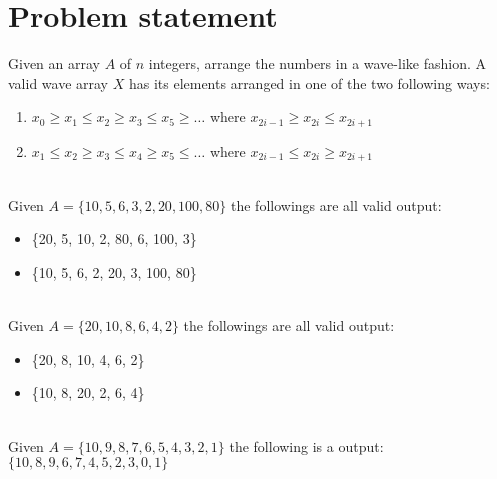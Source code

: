 \section{Problem statement}
\begin{exercise}
Given an array $A$ of $n$ integers, arrange the numbers in a wave-like fashion. A valid wave array $X$ has its elements arranged in one of the two following ways:
	\begin{enumerate}
		\item  $x_0 \geq x_1 \leq x_2 \geq x_3 \leq  x_5 \geq \ldots$ where $x_{2i-1} \geq x_{2i} \leq x_{2i+1}$
		\item  $x_1 \leq x_2 \geq x_3 \leq x_4 \geq x_5 \leq \ldots$ where $x_{2i-1} \leq x_{2i} \geq x_{2i+1}$
	\end{enumerate}


	\begin{example}
		\hfill \\
		\label{ex:wave_array:example1}
		Given $A= \{10, 5, 6, 3, 2, 20, 100, 80\}$ the followings are all valid output:
		\begin{itemize}
			\item  \{20, 5, 10, 2, 80, 6, 100, 3\}
			\item  \{10, 5, 6, 2, 20, 3, 100, 80\}
		\end{itemize}
	\end{example}

	\begin{example}
		\hfill \\
		\label{ex:wave_array:example2}
		Given $A= \{20, 10, 8, 6, 4, 2\}$ the followings are all valid output:
		\begin{itemize}
			\item \{20, 8, 10, 4, 6, 2\}
			\item  \{10, 8, 20, 2, 6, 4\}
		\end{itemize}
		
	\end{example}

	\begin{example}
		\hfill \\
		\label{ex:wave_array:example3}
		Given $A= \{10,9,8,7,6,5,4,3,2,1\}$ the following is a output: $\{10, 8, 9, 6, 7, 4, 5, 2, 3, 0,
		1 \}$
		
	\end{example}
\end{exercise}

